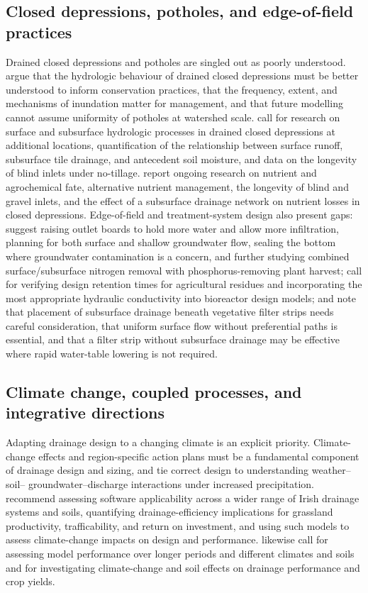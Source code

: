 \documentclass[11pt]{article}
\begin{document}
\subsection{Closed depressions, potholes, and edge-of-field practices}

Drained closed depressions and potholes are singled out as poorly understood.
\textcite{Martin2019} argue that the hydrologic behaviour of drained closed
depressions must be better understood to inform conservation practices, that
the frequency, extent, and mechanisms of inundation matter for management, and
that future modelling cannot assume uniformity of potholes at watershed scale.
\textcite{Williams2020} call for research on surface and subsurface hydrologic
processes in drained closed depressions at additional locations, quantification
of the relationship between surface runoff, subsurface tile drainage, and
antecedent soil moisture, and data on the longevity of blind inlets under
no-tillage. \textcite{Feyereisen2015b} report ongoing research on nutrient and
agrochemical fate, alternative nutrient management, the longevity of blind and
gravel inlets, and the effect of a subsurface drainage network on nutrient
losses in closed depressions. Edge-of-field and treatment-system design also
present gaps: \textcite{Gordon2021} suggest raising outlet boards to hold more
water and allow more infiltration, planning for both surface and shallow
groundwater flow, sealing the bottom where groundwater contamination is a
concern, and further studying combined surface/subsurface nitrogen removal with
phosphorus-removing plant harvest; \textcite{Feyereisen2015} call for verifying
design retention times for agricultural residues and incorporating the most
appropriate hydraulic conductivity into bioreactor design models; and
\textcite{Bhattarai2009} note that placement of subsurface drainage beneath
vegetative filter strips needs careful consideration, that uniform surface flow
without preferential paths is essential, and that a filter strip without
subsurface drainage may be effective where rapid water-table lowering is not
required.

\subsection{Climate change, coupled processes, and integrative directions}

Adapting drainage design to a changing climate is an explicit priority.
Climate-change effects and region-specific action plans must be a fundamental
component of drainage design and sizing, and
\textcite{Deelstra2015} tie correct design to understanding weather--soil--
groundwater--discharge interactions under increased precipitation.
\textcite{Tuohy2018} recommend assessing software applicability across a wider
range of Irish drainage systems and soils, quantifying drainage-efficiency
implications for grassland productivity, trafficability, and return on
investment, and using such models to assess climate-change impacts on design
and performance. \textcite{Malota2024} likewise call for assessing model
performance over longer periods and different climates and soils and for
investigating climate-change and soil effects on drainage performance and crop
yields.
\end{document}

